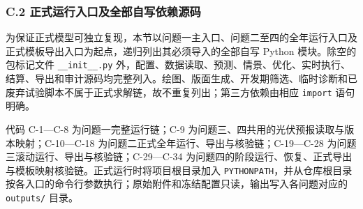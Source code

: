 \documentclass[zihao=-4,a4paper,UTF8,fontset=none]{ctexart}
\begin{document}
\par\pagebreak[2]\subsubsection*{C.2 正式运行入口及全部自写依赖源码}

为保证正式模型可独立复现，本节以问题一主入口、问题二至四的全年运行入口及正式模板导出入口为起点，递归列出其必须导入的全部自写 Python 模块。除空的包标记文件 \texttt{\_\_init\_\_.py} 外，配置、数据读取、预测、情景、优化、实时执行、结算、导出和审计源码均完整列入。绘图、版面生成、开发期筛选、临时诊断和已废弃试验脚本不属于正式求解链，故不重复列出；第三方依赖由相应 \texttt{import} 语句明确。

代码 C-1---C-8 为问题一完整运行链；C-9 为问题三、四共用的光伏预报读取与版本映射；C-10---C-18 为问题二正式全年运行、导出与核验链；C-19---C-28 为问题三滚动运行、导出与核验链；C-29---C-34 为问题四的阶段运行、恢复、正式导出与模板映射核验链。正式运行时将项目根目录加入 \texttt{PYTHONPATH}，并从仓库根目录按各入口的命令行参数执行；原始附件和冻结配置只读，输出写入各问题对应的 \texttt{outputs/} 目录。
\end{document}
